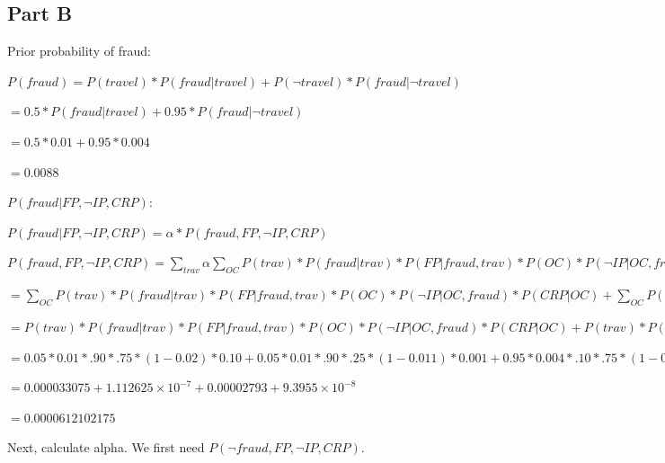 \documentclass[12pt]{article}
\begin{document}
\subsection{Part B}

Prior probability of fraud:

$P(fraud) = P(travel) * P(fraud | travel) + P(\neg travel) * P(fraud | \neg travel)$

$ = 0.5 * P(fraud | travel) + 0.95 * P(fraud | \neg travel)$

$ = 0.5 * 0.01 + 0.95 * 0.004$

$ = 0.0088$

\space

$P(fraud | FP, \neg IP, CRP)$:


$P(fraud | FP, \neg IP, CRP) = α * P(fraud, FP, \neg IP, CRP)$

\space

$ P(fraud, FP, \neg IP, CRP) = \sum_{trav} \alpha \sum_{OC} P(trav) * P(fraud | trav) * P(FP | fraud, trav) * P(OC) * P(\neg IP | OC, fraud) * P(CRP | OC)$

$ = \sum_{OC} P(trav) * P(fraud | trav) * P(FP | fraud, trav) * P(OC) * P(\neg IP | OC, fraud) * P(CRP | OC) +

\sum_{OC} P(\neg trav) * P(fraud | \neg trav) * P(FP | fraud, \neg trav) * P(OC) * P(\neg IP | OC, fraud) * P(CRP | OC)$

$ = P(trav) * P(fraud | trav) * P(FP | fraud, trav) * P(OC) * P(\neg IP | OC, fraud) * P(CRP | OC) +

P(trav) * P(fraud | trav) * P(FP | fraud, trav) * P(\neg OC) * P(\neg IP | \neg OC, fraud) * P(CRP | \neg OC) +

P(\neg trav) * P(fraud | \neg trav) * P(FP | fraud, \neg trav) * P(OC) * P(\neg IP | OC, fraud) * P(CRP | OC) +

P(\neg trav) * P(fraud | \neg trav) * P(FP | fraud, \neg trav) * P(\neg OC) * P(\neg IP | \neg OC, fraud) * P(CRP | \neg OC)$

$ = 0.05 * 0.01 * .90 * .75 * (1 - 0.02) * 0.10 +

0.05 * 0.01 * .90 * .25 * (1 - 0.011) * 0.001 +

0.95 * 0.004 * .10 * .75 * (1 - 0.02) * 0.10 +

0.95 * 0.004 * .10 * .25 * (1 - 0.011) * 0.001$

$ = 0.000033075 + 1.112625\times10^{-7} + 0.00002793 + 9.3955\times10^{-8}$

$ = 0.0000612102175$

Next, calculate alpha. We first need $P(\neg fraud, FP, \neg IP, CRP)$.
\end{document}
